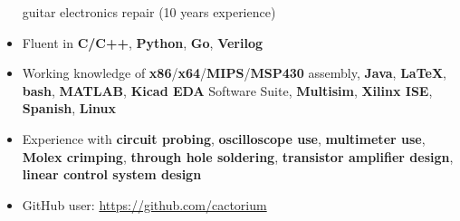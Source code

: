\documentclass{my_resume}
\begin{document}
\begin{itemize}
        guitar electronics repair (10 years experience)
    \item Fluent in \textbf{C/C++}, \textbf{Python}, \textbf{Go}, \textbf{Verilog}
	\item Working knowledge of \textbf{x86}/\textbf{x64}/\textbf{MIPS}/\textbf{MSP430} assembly,
            \textbf{Java}, \textbf{LaTeX}, \textbf{bash}, \textbf{MATLAB},
            \textbf{Kicad EDA} Software Suite, \textbf{Multisim}, \textbf{Xilinx ISE},
            \textbf{Spanish}, \textbf{Linux}
    \item Experience with \textbf{circuit probing}, \textbf{oscilloscope use},
            \textbf{multimeter use}, \textbf{Molex crimping},
            \textbf{through hole soldering}, \textbf{transistor amplifier design},
            \textbf{linear control system design}
    \item GitHub user: \url{https://github.com/cactorium}
\end{itemize}
\end{document}
